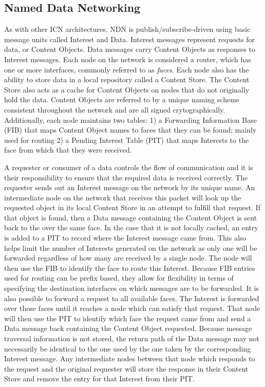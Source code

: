\documentclass[a4paper,12pt]{report}      %
\begin{document}
\subsection{Named Data Networking}
As with other ICN architectures, NDN is publish/subscribe-driven using basic message units called
Interest and Data. Interest messages represent requests for data, or Content Objects. 
Data messages carry Content Objects as responses to Interest messages. 
Each node on the network is considered a router, which has one or more interfaces,
commonly referred to as \textit{faces}. Each node also has the ability to store data in a
 local repository called a Content Store. The Content Store also acts as a cache for Content Objects on nodes 
that do not originally hold the data. Content Objects are referred to by a unique naming scheme consistent throughout the network and are all
signed crytographically. Additionally, each node maintains two tables: 1) a Forwarding Information Base
(FIB) that maps Content Object names to faces that they can be found; mainly used for routing 2) a
Pending Interest Table (PIT) that maps Interests to the face from which that they were received.

A requester or consumer of a data controls the flow of communication and it is their responsibility to
ensure that the required data is received correctly. The requester sends out an Interest message on the
network by its unique name. An intermediate node on the network that receives this packet will look
up the requested object in its local Content Store in an attempt to fulfill that request. If that object is
found, then a Data message containing the Content Object is sent back to the over the same face. In the
case that it is not locally cached, an entry is added to a PIT to record where the Interest message came
from. This also helps limit the number of Interests generated on the network as only one will be
forwarded regardless of how many are received by a single node. The node will then use the FIB to
identify the face to route this Interest. Because FIB entries used for routing
can be prefix based, they allow for flexibility in terms of specifying the destination interfaces on which 
messages are to be forwarded. It is also possible to forward a request to all available faces. 
The Interest is forwarded over those faces until it reaches a node which can satisfy that request. 
That node will then use the PIT to identify which face the request came from and send a Data message
 back containing the Content Object requested. Because message traversal information is not stored, 
the return path of the Data message may not necessarily be identical to the one used by the one taken by the corresponding Interest message.
Any intermediate nodes between that node which responds to the request and the original requester will
store the response in their Content Store and remove the entry for that Interest from their PIT\cite{nnc}. 
\end{document}
